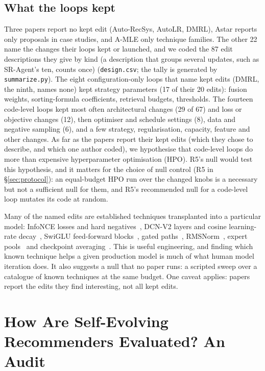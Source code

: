 \documentclass[sigconf,nonacm]{acmart}
\begin{document}
\subsection{What the loops kept}\label{sec:kept}
Three papers report no kept edit (Auto-RecSys, AutoLR, DMRL), Astar reports only proposals in case
studies, and A-MLE only technique families. The other 22 name the changes their loops kept or launched, and we coded
the 87 edit descriptions they give by kind (a description that groups several updates, such as SR-Agent's ten, counts once) (\texttt{design.csv}; the tally is generated by \texttt{summarize.py}). The eight configuration-only loops that name kept edits (DMRL, the ninth, names none) kept strategy parameters (17 of their 20 edits): fusion
weights, sorting-formula coefficients, retrieval budgets, thresholds. The fourteen code-level loops kept most
often architectural changes (29 of 67) and loss or objective changes (12), then optimiser and
schedule settings (8), data and negative sampling (6), and a few strategy, regularisation, capacity,
feature and other changes. As far as the papers report their kept edits (which they chose to describe, and which one author coded), we hypothesise
that code-level loops do more than expensive hyperparameter optimisation (HPO). R5's null would test this hypothesis, and it matters for the choice of null control (R5 in
\S\ref{sec:protocol}): an equal-budget HPO run over the changed knobs is a necessary but not a sufficient null for them, and R5's recommended null for a code-level loop mutates its code at random.

Many of the named edits are established techniques transplanted into a particular model: InfoNCE losses and hard
negatives~\cite{kim2026selfevolverec,mu2026evorec,chandran2026autoresearch}, DCN-V2 layers and cosine learning-rate
decay~\cite{pan2026recevolve}, SwiGLU feed-forward blocks~\cite{cao2026virtualmle,liu2026nova}, gated
paths~\cite{wang2026selfevolving}, RMSNorm~\cite{zhuang2026trajectories}, expert pools~\cite{yang2026agentxmodel} and
checkpoint averaging~\cite{peng2026population}. This is useful engineering, and finding which known technique helps a
given production model is much of what human model iteration does. It also suggests a null that no paper runs: a
scripted sweep over a catalogue of known techniques at the same budget. One caveat applies: papers report the edits they find interesting, not all kept
edits.

\section{How Are Self-Evolving Recommenders Evaluated? An Audit}\label{sec:audit}
\end{document}
